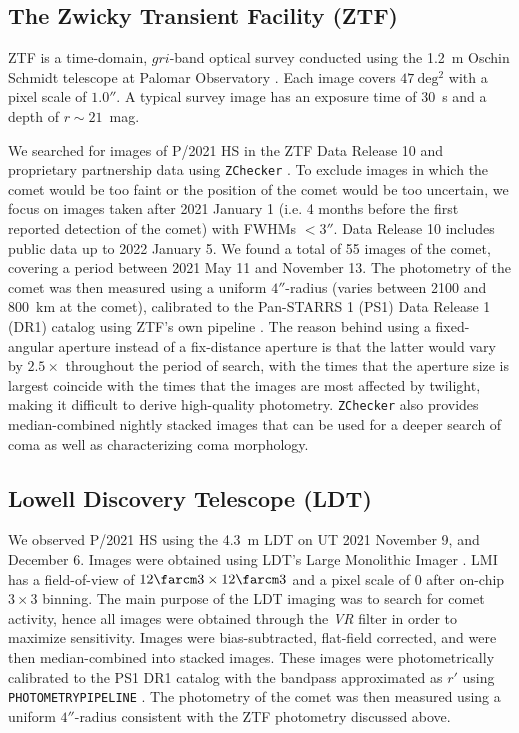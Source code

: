\documentclass[modern]{aastex631}
\begin{document}
\begin{CJK*}{UTF8}{gbsn}
\subsection{The Zwicky Transient Facility (ZTF)}

ZTF is a time-domain, $gri$-band optical survey conducted using the 1.2~m Oschin Schmidt telescope at Palomar Observatory \citep{Bellm2019, Graham2019}. Each image covers $47~\mathrm{deg^2}$ with a pixel scale of $1.0''$. A typical survey image has an exposure time of 30~s and a depth of $r\sim21$~mag.

We searched for images of P/2021 HS in the ZTF Data Release 10 and proprietary partnership data using {\tt ZChecker} \citep{Kelley2019b}. To exclude images in which the comet would be too faint or the position of the comet would be too uncertain, we focus on images taken after 2021 January 1 (i.e. 4 months before the first reported detection of the comet) with FWHMs $<3''$. Data Release 10 includes public data up to 2022 January 5. We found a total of 55 images of the comet, covering a period between 2021 May 11 and November 13. The photometry of the comet was then measured using a uniform $4''$-radius (varies between 2100 and 800~km at the comet), calibrated to the Pan-STARRS 1 (PS1) Data Release 1 (DR1) catalog \citep{Chambers2016} using ZTF's own pipeline \citep{Masci2019}. The reason behind using a fixed-angular aperture instead of a fix-distance aperture is that the latter would vary by $2.5\times$ throughout the period of search, with the times that the aperture size is largest coincide with the times that the images are most affected by twilight, making it difficult to derive high-quality photometry. {\tt ZChecker} also provides median-combined nightly stacked images that can be used for a deeper search of coma as well as characterizing coma morphology.

\subsection{Lowell Discovery Telescope (LDT)}

We observed P/2021 HS using the 4.3~m LDT on UT 2021 November 9, and December 6. Images were obtained using LDT's Large Monolithic Imager \citep[LMI;][]{Massey2013}. LMI has a field-of-view of $12\farcm3\times12\farcm3$ and a pixel scale of 0 after on-chip $3\times3$ binning. The main purpose of the LDT imaging was to search for comet activity, hence all images were obtained through the \textit{VR} filter in order to maximize sensitivity. Images were bias-subtracted, flat-field corrected, and were then median-combined into stacked images. These images were photometrically calibrated to the PS1 DR1 catalog \citep{Chambers2016} with the bandpass approximated as $r'$ using {\tt PHOTOMETRYPIPELINE} \citep{Mommert2017}. The photometry of the comet was then measured using a uniform $4''$-radius consistent with the ZTF photometry discussed above.


\end{CJK*}
\end{document}
